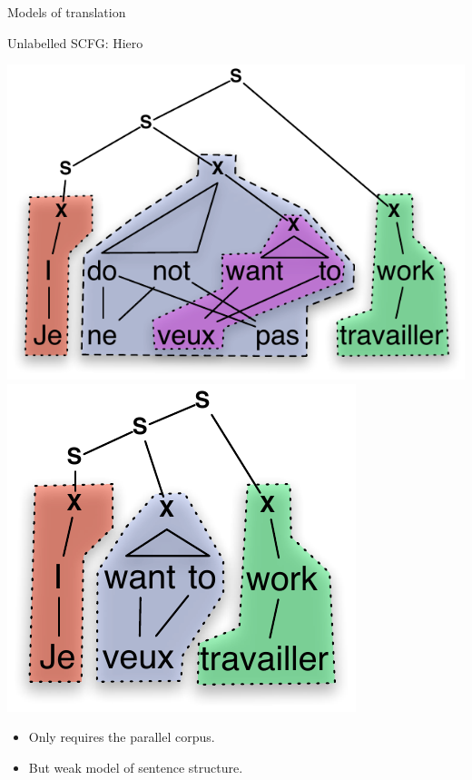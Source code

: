 \documentclass{beamer}
\begin{document}
\begin{frame}[t]{Models of translation}
\begin{block}{Unlabelled SCFG: Hiero}
  \begin{center}
    \includegraphics[scale=0.55]{JeNeVeuxPasTravailler-Hiero.pdf}
    \hspace{0.3in}
    \includegraphics[scale=0.55]{JeVeuxTravailler-Hiero.pdf}
  \end{center}
\end{block}
\begin{itemize}
\item Only requires the parallel corpus.
\item But weak model of sentence structure.
\end{itemize}
\end{frame}
\end{document}
